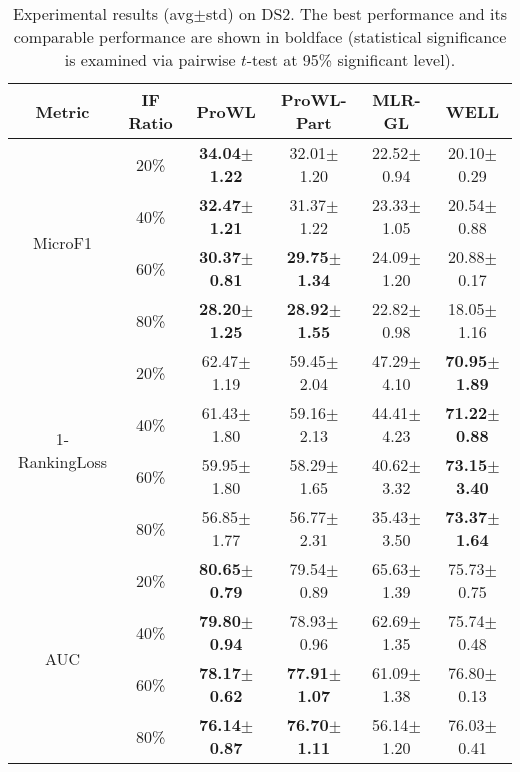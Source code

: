 \documentclass{llncs} %
\begin{document}
\begin{table*}[h!]
\scriptsize
\caption{Experimental results (avg$\pm$std) on DS2. The best performance and its comparable performance are shown in boldface (statistical significance is examined via pairwise $t$-test at 95\% significant level).}
\centering
\begin{tabular}{|c| c| c| c| c| c|}
\hline
Metric &IF Ratio &ProWL &ProWL-Part &MLR-GL &WELL\\
\hline
\multirow{4}{*}{MicroF1}
& 20\% &\bf 34.04$\pm$1.22 &32.01$\pm$1.20 &22.52$\pm$0.94 &20.10$\pm$0.29\\
& 40\% &\bf 32.47$\pm$1.21 &31.37$\pm$1.22 &23.33$\pm$1.05 &20.54$\pm$0.88\\
& 60\% &\bf 30.37$\pm$0.81 &\bf 29.75$\pm$1.34 &24.09$\pm$1.20 &20.88$\pm$0.17\\
& 80\% &\bf 28.20$\pm$1.25 &\bf 28.92$\pm$1.55 &22.82$\pm$0.98 &18.05$\pm$1.16\\
\hline
\multirow{4}{*}{1-RankingLoss}
& 20\% &62.47$\pm$1.19 &59.45$\pm$2.04 &47.29$\pm$4.10 &\bf 70.95$\pm$1.89\\
& 40\% &61.43$\pm$1.80 &59.16$\pm$2.13 &44.41$\pm$4.23 &\bf 71.22$\pm$0.88\\
& 60\% &59.95$\pm$1.80 &58.29$\pm$1.65 &40.62$\pm$3.32 &\bf 73.15$\pm$3.40\\
& 80\% &56.85$\pm$1.77 &56.77$\pm$2.31 &35.43$\pm$3.50 &\bf 73.37$\pm$1.64\\
\hline
\multirow{4}{*}{AUC}
& 20\% &\bf 80.65$\pm$0.79 &79.54$\pm$0.89 &65.63$\pm$1.39 &75.73$\pm$0.75\\
& 40\% &\bf 79.80$\pm$0.94 &78.93$\pm$0.96 &62.69$\pm$1.35 &75.74$\pm$0.48\\
& 60\% &\bf 78.17$\pm$0.62 &\bf 77.91$\pm$1.07 &61.09$\pm$1.38 &76.80$\pm$0.13\\
& 80\% &\bf 76.14$\pm$0.87 &\bf 76.70$\pm$1.11 &56.14$\pm$1.20 &76.03$\pm$0.41\\
\hline
\end{tabular}
\label{Table3}
\end{table*}
\end{document}
